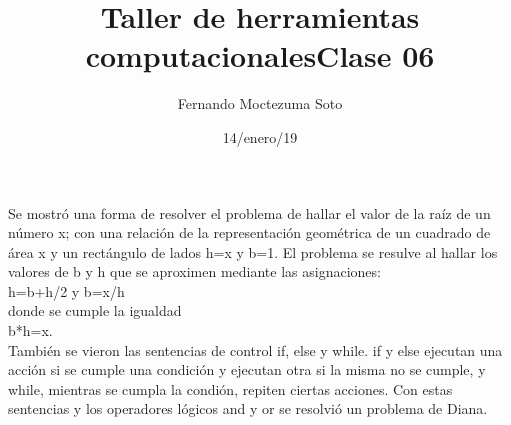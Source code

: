 \documentclass[etterpaper, 12pt, oneside]{article}%
\title{\Huge Taller de herramientas computacionales}
\author{Fernando Moctezuma Soto}
\date{14/enero/19}
\begin{document}
	\maketitle
	
	\newpage
	
	\title{\Huge Clase 06\\}
	
	Se mostró una forma de resolver el problema de hallar el valor de la raíz de un número x; con una relación de la representación geométrica de un cuadrado de área x y un rectángulo de lados h=x y b=1. El problema se resulve al hallar los valores de b y h que se aproximen mediante las asignaciones:\\h=b+h/2 y b=x/h\\donde se cumple la igualdad\\ b*h=x.\\
	También se vieron las sentencias de control if, else y while. if y else ejecutan una acción si se cumple una condición y ejecutan otra si la misma no se cumple, y while, mientras se cumpla la condión, repiten ciertas acciones. Con estas sentencias y los operadores lógicos and y or se resolvió un problema de Diana.
	
	
	
	
\end{document}
